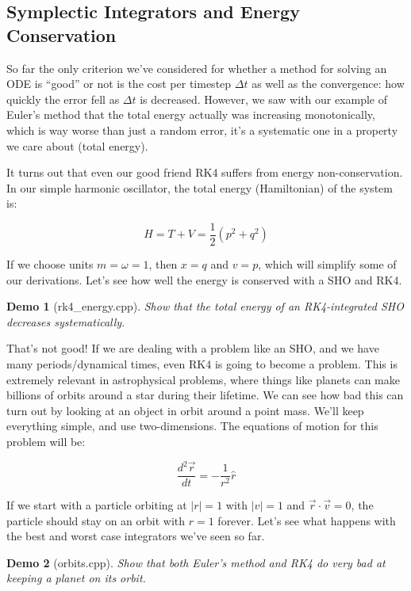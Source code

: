 \documentclass{article}
\theoremstyle{demo}
\newtheorem{demo}{Demo}[section]
\begin{document}
\subsection{Symplectic Integrators and Energy Conservation}
So far the only criterion we've considered for whether a method for solving an
ODE is ``good'' or not is the cost per timestep $\Delta t$ as well as the
convergence: how quickly the error fell as $\Delta t$ is decreased.  However,
we saw with our example of Euler's method that the total energy actually was
increasing monotonically, which is way worse than just a random error, it's a
systematic one in a property we care about (total energy).  

It turns out that even our good friend RK4 suffers from energy non-conservation.
In our simple harmonic oscillator, the total energy (Hamiltonian) of the system
is:

\begin{equation}
    H = T + V = \frac{1}{2}(p^2 + q^2)
    \label{SHO_Hamiltonian}
\end{equation}

If we choose units $m=\omega=1$, then $x=q$ and $v=p$, which will simplify some
of our derivations.  Let's see how well the energy is conserved with a SHO and
RK4.

\begin{demo}[rk4\_energy.cpp]
    Show that the total energy of an RK4-integrated SHO decreases systematically.
\end{demo}

That's not good!  If we are dealing with a problem like an SHO, and we have many
periods/dynamical times, even RK4 is going to become a problem.  This is
extremely relevant in astrophysical problems, where things like planets can
make billions of orbits around a star during their lifetime.  We can see how bad
this can turn out by looking at an object in orbit around a point mass.  We'll
keep everything simple, and use two-dimensions.  The equations of motion for
this problem will be:

\begin{equation}
    \frac{d^2 \vec r}{dt} = -\frac{1}{r^2} \hat r
\end{equation}

If we start with a particle orbiting at $|r|=1$ with $|v|=1$ and $\vec r \cdot
\vec v = 0$, the particle should stay on an orbit with $r=1$ forever.  Let's see
what happens with the best and worst case integrators we've seen so far.

\begin{demo}[orbits.cpp]
    Show that both Euler's method and RK4 do very bad at keeping a planet on
    its orbit.
\end{demo}
\end{document}
